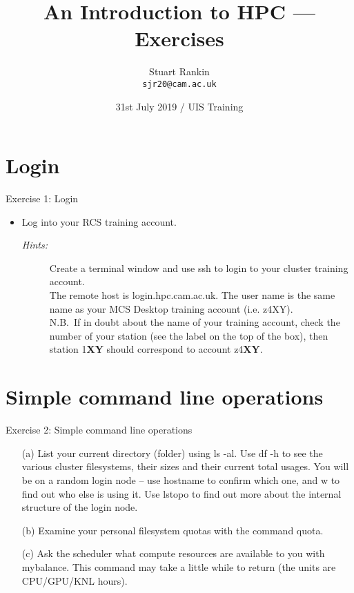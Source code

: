 \documentclass{beamer}
\title[An Introduction to HPC --- Exercises] %
{An Introduction to HPC --- Exercises}
\author[SJ Rankin] %
{Stuart Rankin\\ \texttt{sjr20@cam.ac.uk}}
\institute[UIS, University of Cambridge] %
{Research Computing Services (http://www.hpc.cam.ac.uk/)\\
University Information Services (http://www.uis.cam.ac.uk/)}
\date[31/07/2019] %
{31st July 2019 / UIS Training}
\begin{document}
\begin{frame}
  \titlepage
\end{frame}

\section{Login}
\begin{frame}{Exercise 1: Login}
\begin{itemize}
\item{Log into your RCS training account.}
\begin{description}
\item[\emph{Hints:}]{\small Create a terminal window and use \alert{ssh} to login to your cluster training account. \\\smallskip
The remote host is \alert{login.hpc.cam.ac.uk}. The user name is the same name as your MCS Desktop training account (i.e. \alert{z4XY}).\hfill\\\smallskip
{\scriptsize N.B.\ If in doubt about the name of your training account, check the number of your station (see the label on the top of the box), then station 1\textbf{XY} should correspond to account z4\textbf {XY}.}\hfill\\\smallskip
}
\end{description}
\end{itemize}
\end{frame}


\section{Simple command line operations}
\begin{frame}{Exercise 2: Simple command line operations}
\begin{itemize}

\item[(a)]{List your current directory (folder) using \alert{ls -al}. Use \alert{df -h} to see the various cluster filesystems, their sizes and their current total usages. You will be on a random login node -- use \alert{hostname} to confirm which one, and \alert{w} to find out who else is using it. Use \alert{lstopo} to find out more about the internal structure of the login node.}

\item[(b)]{Examine your personal filesystem quotas with the command \alert{quota}.}
 
\item[(c)]{Ask the scheduler what compute resources are available to you with \alert{mybalance}. This command may take a little while to return (the units are CPU/GPU/KNL hours).}

\end{itemize}
\end{frame}
\end{document}
